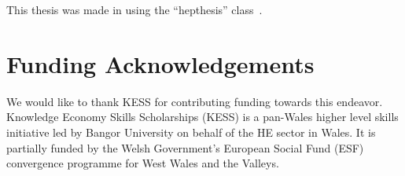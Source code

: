 \begin{colophon}
  This thesis was made in \LaTeXe{} using the ``hepthesis'' class~\cite{hepthesis}.
\end{colophon}

\section*{Funding Acknowledgements}
We would like to thank KESS for contributing funding towards this endeavor. Knowledge Economy Skills Scholarships (KESS) is a pan-Wales higher level skills initiative led by Bangor University on behalf of the HE sector in Wales. It is partially funded by the
Welsh Government’s European Social Fund (ESF) convergence programme for West Wales and the Valleys.


\scriptsize



{\hypersetup{linkcolor=black}
\listoffigures
\listoftables
}

